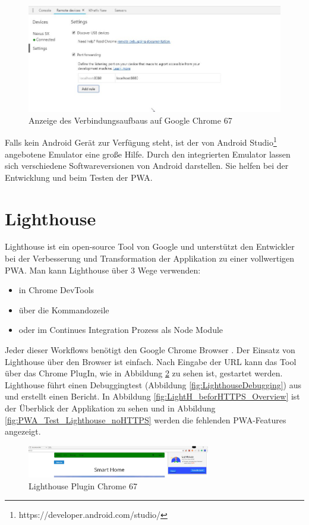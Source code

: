 \begin{figure}[h]
	\centering
	\includegraphics[width=14cm]{BilderAllgemein/DevToolsChrome}\medskip
	\caption{Anzeige des Verbindungsaufbaus auf Google Chrome 67}
	\label{fig:DevToolsChrome}
\end{figure}
\newpage
Falls kein Android Gerät zur Verfügung steht, ist der von Android Studio\footnote{https://developer.android.com/studio/} angebotene Emulator eine große Hilfe. Durch den integrierten Emulator lassen sich verschiedene Softwareversionen von Android darstellen. Sie helfen bei der Entwicklung und beim Testen der \acs{PWA}.

\section{Lighthouse}
Lighthouse ist ein open-source Tool von Google und unterstützt den Entwickler bei der Verbesserung und Transformation der Applikation zu einer vollwertigen \acs{PWA}. Man kann Lighthouse über 3 Wege verwenden:
\begin{itemize}
    \item  in Chrome DevTools
	\item  über die Kommandozeile
	\item  oder im Continues Integration Prozess als Node Module
\end{itemize}
Jeder dieser Workflows benötigt den Google Chrome Browser \cite{Lighthouse}.
Der Einsatz von Lighthouse über den Browser ist einfach. Nach Eingabe der URL kann das Tool über das Chrome PlugIn, wie in Abbildung \ref{fig:LighthousePlugIN} zu sehen ist, gestartet werden. Lighthouse führt einen Debuggingtest (Abbildung \ref{fig:LighthouseDebugging}) aus und erstellt einen Bericht. In Abbildung \ref{fig:LightH_beforHTTPS_Overview} ist der Überblick der Applikation zu sehen und in Abbildung \ref{fig:PWA_Test_Lighthouse_noHTTPS} werden die fehlenden PWA-Features angezeigt.

\begin{figure}[h]
	\centering
	\includegraphics[width=8cm]{BilderAllgemein/Test/LighthousePlugIN}\medskip
	\caption{Lighthouse Plugin Chrome 67 }
	\label{fig:LighthousePlugIN}
\end{figure}

